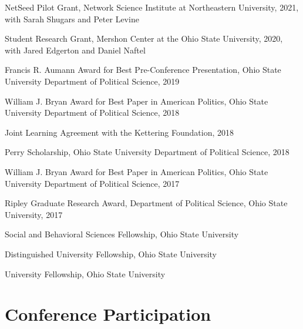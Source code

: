 \documentclass[letterpaper]{article}
\renewenvironment{itemize}{
  \begin{list}{}{
    \setlength{\leftmargin}{1.5em}
  }
}{
  \end{list}
}
\begin{document}
\begin{itemize}

\item NetSeed Pilot Grant, Network Science Institute at Northeastern University, 2021, with Sarah Shugars and Peter Levine

\item Student Research Grant, Mershon Center at the Ohio State University, 2020, with Jared Edgerton and Daniel Naftel

\item Francis R. Aumann Award for Best Pre-Conference Presentation, Ohio State University Department of Political Science, 2019

\item William J. Bryan Award for Best Paper in American Politics, Ohio State University Department of Political Science, 2018

\item Joint Learning Agreement with the Kettering Foundation, 2018

\item Perry Scholarship, Ohio State University Department of Political Science, 2018

\item William J. Bryan Award for Best Paper in American Politics, Ohio State University Department of Political Science, 2017

\item Ripley Graduate Research Award, Department of Political Science, Ohio State University, 2017

\item Social and Behavioral Sciences Fellowship, Ohio State University

\item Distinguished University Fellowship, Ohio State University

\item University Fellowship, Ohio State University
\end{itemize}

\section*{Conference Participation}
\end{document}
